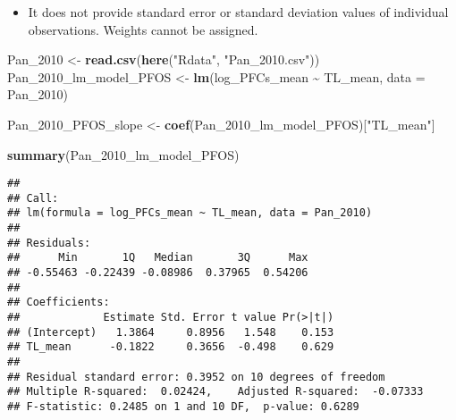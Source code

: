 \documentclass[
]{article}
\newenvironment{Shaded}{\begin{snugshade}}{\end{snugshade}}
\newcommand{\AttributeTok}[1]{\textcolor[rgb]{0.13,0.29,0.53}{#1}}
\newcommand{\FunctionTok}[1]{\textcolor[rgb]{0.13,0.29,0.53}{\textbf{#1}}}
\newcommand{\NormalTok}[1]{#1}
\newcommand{\OtherTok}[1]{\textcolor[rgb]{0.56,0.35,0.01}{#1}}
\newcommand{\SpecialCharTok}[1]{\textcolor[rgb]{0.81,0.36,0.00}{\textbf{#1}}}
\newcommand{\StringTok}[1]{\textcolor[rgb]{0.31,0.60,0.02}{#1}}
\providecommand{\tightlist}{%
  \setlength{\itemsep}{0pt}\setlength{\parskip}{0pt}}
\begin{document}
\begin{itemize}
\tightlist
\item
  It does not provide standard error or standard deviation values of
  individual observations. Weights cannot be assigned.
\end{itemize}

\begin{Shaded}
\begin{Highlighting}[]
\NormalTok{Pan\_2010 }\OtherTok{\textless{}{-}} \FunctionTok{read.csv}\NormalTok{(}\FunctionTok{here}\NormalTok{(}\StringTok{"Rdata"}\NormalTok{, }\StringTok{"Pan\_2010.csv"}\NormalTok{))}
\NormalTok{Pan\_2010\_lm\_model\_PFOS }\OtherTok{\textless{}{-}} \FunctionTok{lm}\NormalTok{(log\_PFCs\_mean }\SpecialCharTok{\textasciitilde{}}\NormalTok{ TL\_mean,}
                                \AttributeTok{data =}\NormalTok{ Pan\_2010)}

\NormalTok{Pan\_2010\_PFOS\_slope }\OtherTok{\textless{}{-}} \FunctionTok{coef}\NormalTok{(Pan\_2010\_lm\_model\_PFOS)[}\StringTok{"TL\_mean"}\NormalTok{]}

\FunctionTok{summary}\NormalTok{(Pan\_2010\_lm\_model\_PFOS)}
\end{Highlighting}
\end{Shaded}

\begin{verbatim}
## 
## Call:
## lm(formula = log_PFCs_mean ~ TL_mean, data = Pan_2010)
## 
## Residuals:
##      Min       1Q   Median       3Q      Max 
## -0.55463 -0.22439 -0.08986  0.37965  0.54206 
## 
## Coefficients:
##             Estimate Std. Error t value Pr(>|t|)
## (Intercept)   1.3864     0.8956   1.548    0.153
## TL_mean      -0.1822     0.3656  -0.498    0.629
## 
## Residual standard error: 0.3952 on 10 degrees of freedom
## Multiple R-squared:  0.02424,    Adjusted R-squared:  -0.07333 
## F-statistic: 0.2485 on 1 and 10 DF,  p-value: 0.6289
\end{verbatim}
\end{document}
